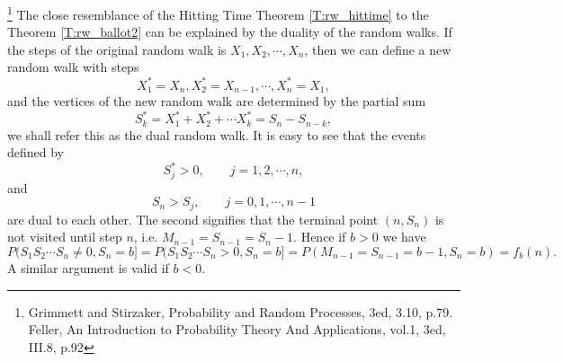 \begin{remark} 
\footnote{Grimmett and Stirzaker, Probability and Random Processes, 3ed, 
          3.10, p.79. Feller, An Introduction to Probability Theory
          And Applications, vol.1, 3ed, III.8, p.92}
The close resemblance of the Hitting Time Theorem \ref{T:rw_hittime} to
the Theorem \ref{T:rw_ballot2} can be explained by the duality of the random
walks. If the steps of the original random walk is $X_1,X_2,\cdots,X_n$, then
we can define a new random walk with steps
\[
  X_1^*=X_n, X_2^*=X_{n-1}, \cdots, X_n^*=X_1,
\]
and the vertices of the new random walk are determined by the partial sum
\[
  S_k^*=X_1^*+X_2^*+\cdots X_k^* = S_n-S_{n-k},
\]
we shall refer this as the dual random walk.
It is easy to see that the events defined by
\[
  S_j^*>0, \qquad j=1,2,\cdots,n,
\]
and 
\[
  S_n > S_j,  \qquad j=0,1,\cdots,n-1
\]
are dual to each other. The second signifies that the terminal point $(n,S_n)$ 
is not visited until step $n$, i.e. $M_{n-1}=S_{n-1}=S_n-1$. Hence if $b>0$ 
we have
\[
  P(S_1S_2\cdots S_n\neq 0, S_n=b] = P(S_1S_2\cdots S_n> 0, S_n=b] 
    = P(M_{n-1}=S_{n-1}=b-1, S_n=b) = f_b(n).
\]
A similar argument is valid if $b<0$.
\end{remark} 


